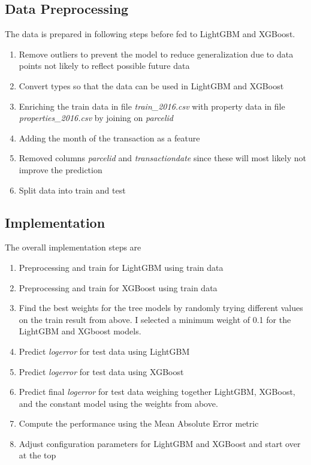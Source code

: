 \documentclass[a4paper]{article}
\begin{document}
\subsection{Data Preprocessing}
The data is prepared in following steps before fed to LightGBM and XGBoost.
\begin{enumerate}
    \item Remove outliers to prevent the model to reduce generalization due to data points not likely to
        reflect possible future data
    \item Convert types so that the data can be used in LightGBM and XGBoost
    \item Enriching the train data in file \textit{train\_2016.csv} with property data in file
        \textit{properties\_2016.csv} by joining on \textit{parcelid}
    \item Adding the month of the transaction as a feature
    \item Removed columns \textit{parcelid} and \textit{transactiondate} since these will most likely not
        improve the prediction
    \item Split data into train and test
\end{enumerate}

\subsection{Implementation}
The overall implementation steps are
\begin{enumerate}
    \item Preprocessing and train for LightGBM using train data
    \item Preprocessing and train for XGBoost using train data
    \item Find the best weights for the tree models by randomly trying different values on the train result
        from above. I selected a minimum weight of 0.1 for the LightGBM and XGboost models.
    \item Predict \textit{logerror} for test data using LightGBM
    \item Predict \textit{logerror} for test data using XGBoost
    \item Predict final \textit{logerror} for test data weighing together LightGBM, XGBoost, and the
        constant model using the weights from above.
    \item Compute the performance using the Mean Absolute Error metric
    \item Adjust configuration parameters for LightGBM and XGBoost and start over at the top
\end{enumerate}
\end{document}
